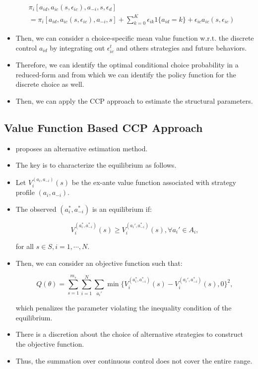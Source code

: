 \documentclass[]{book}
\providecommand{\tightlist}{%
  \setlength{\itemsep}{0pt}\setlength{\parskip}{0pt}}
\begin{document}
\begin{equation}
\begin{split}
&\pi_i[a_{id}, a_{ic}(s, \epsilon_{ic}), a_{-i}, s, \epsilon_{d}] \\
&= \pi_i[a_{id}, a_{ic}(s, \epsilon_{ic}), a_{-i}, s] +\sum_{k = 0}^K \epsilon_{ik}1\{a_{id} = k\} + \epsilon_{ic} a_{ic}(s, \epsilon_{ic})
\end{split}
\end{equation}

\begin{itemize}
\tightlist
\item
  Then, we can consider a choice-specific mean value function w.r.t. the
  discrete control \(a_{id}\) by integrating out \(\epsilon_{ic}^t\) and
  others strategies and future behaviors.
\item
  Therefore, we can identify the optimal conditional choice probability
  in a reduced-form and from which we can identify the policy function
  for the discrete choice as well.
\item
  Then, we can apply the CCP approach to estimate the structural
  parameters.
\end{itemize}

\subsection{Value Function Based CCP
Approach}\label{value-function-based-ccp-approach}

\begin{itemize}
\tightlist
\item
  \citet{bajariEstimatingDynamicModels2007} proposes an alternative
  estimation method.
\item
  The key is to characterize the equilibrium as follows.
\item
  Let \(V_i^{(a_i, a_{-i})}(s)\) be the ex-ante value function
  associated with strategy profile \((a_i, a_{-i})\).
\item
  The observed \((a_i^*, a_{-i}^*)\) is an equilibrium if:

  \begin{equation}
  V_i^{(a_i^*, a_{-i}^*)}(s) \ge V_i^{(a_i', a_{-i}^*)}(s), \forall a_i' \in A_i,
  \end{equation}

  for all \(s \in S, i = 1, \cdots, N\).
\item
  Then, we can consider an objective function such that:

  \begin{equation}
  Q(\theta) = \sum_{s = 1}^{m_s} \sum_{i = 1}^N \sum_{a_i'} \min\{V_i^{(a_i^*, a_{-i}^*)}(s) - V_i^{(a_i', a_{-i}^*)}(s), 0\}^2,
  \end{equation}

  which penalizes the parameter violating the inequality condition of
  the equilibrium.
\item
  There is a discretion about the choice of alternative strategies to
  construct the objective function.
\item
  Thus, the summation over continuous control does not cover the entire
  range.
\end{itemize}
\end{document}
